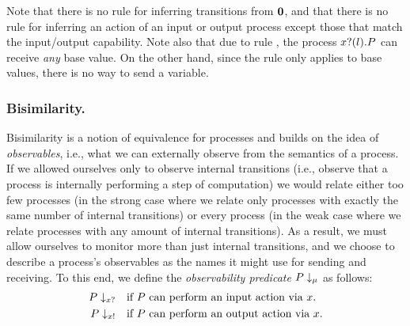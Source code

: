 \documentclass[runningheads]{llncs}
\begin{document}
Note that there is no rule for inferring transitions from \( \bm{0} \), and that there is no rule for inferring an action of an input or output process except those that match the input/output capability.
Note also that due to rule , the process \( x ? (l) . P \) can receive \emph{any} base value.
On the other hand, since the rule  only applies to base values, there is no way to send a variable.


\subsubsection{Bisimilarity.}
Bisimilarity is a notion of equivalence for processes and
builds on the idea of \emph{observables}, i.e., what we can externally
observe from the semantics of a process. If we allowed ourselves only
to observe internal transitions (i.e., observe that a process is
internally performing a step of computation) we would relate either
too few processes (in the strong case where we relate only processes
with exactly the same number of internal transitions) or every process
(in the weak case where we relate processes with any amount of
internal transitions).  As a result, we must allow ourselves to
monitor more than just internal transitions, and we choose to describe
a process's observables as the names it might use for sending and
receiving.
To this end, we define the \emph{observability predicate}
\( P\downarrow_{\mu} \) as follows:
\begin{align*}
  P\downarrow_{x?}  &\quad \textrm{if \( P \) can perform an input action via \( x \).} \\
  P\downarrow_{x!} &\quad \textrm{if \( P \) can perform an output action via \( x \).}
\end{align*}
\end{document}
